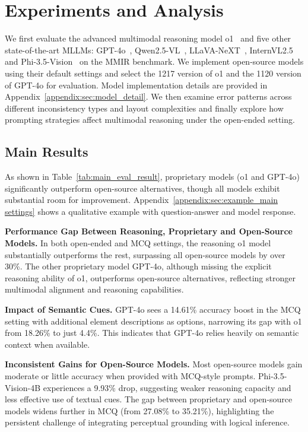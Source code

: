 \section{Experiments and Analysis}



We first evaluate the advanced multimodal reasoning model o1~\cite{openai2024gpto1card} and five other state-of-the-art MLLMs: GPT-4o~\cite{openai2024gpt4ocard}, Qwen2.5-VL~\cite{Qwen2.5-VL}, LLaVA-NeXT~\cite{liu2024llavanext}, InternVL2.5~\cite{Chen2024ExpandingPB} and Phi-3.5-Vision~\cite{abdin2024phi3technicalreporthighly} on the MMIR benchmark. We implement open-source models using their default settings and select the 1217 version of o1 and the 1120 version of GPT-4o for evaluation. Model implementation details are provided in Appendix~\ref{appendix:sec:model_detail}.
We then examine error patterns across different inconsistency types and layout complexities and finally explore how prompting strategies affect multimodal reasoning under the open-ended setting.

\subsection{Main Results}

As shown in Table~\ref{tab:main_eval_result}, proprietary models (o1 and GPT-4o) significantly outperform open-source alternatives, though all models exhibit substantial room for improvement. Appendix~\ref{appendix:sec:example_main settings} shows a qualitative example with question-answer and model response.

\noindent\textbf{Performance Gap Between Reasoning, Proprietary and Open-Source Models.} In both open-ended and MCQ settings, the reasoning o1 model substantially outperforms the rest, surpassing all open-source models by over 30\%. The other proprietary model GPT-4o, although missing the explicit reasoning ability of o1, outperforms open-source alternatives, reflecting stronger multimodal alignment and reasoning capabilities.

\noindent\textbf{Impact of Semantic Cues.} GPT-4o sees a 14.61\% accuracy boost in the MCQ setting with additional element descriptions as options, narrowing its gap with o1 from 18.26\% to just 4.4\%. This indicates that GPT-4o relies heavily on semantic context when available. 

\noindent\textbf{Inconsistent Gains for Open-Source Models.} Most open-source models gain moderate or little accuracy when provided with MCQ-style prompts. Phi-3.5-Vision-4B experiences a 9.93\% drop, suggesting weaker reasoning capacity and less effective use of textual cues. The gap between proprietary and open-source models widens further in MCQ (from 27.08\% to 35.21\%), highlighting the persistent challenge of integrating perceptual grounding with logical inference. 

